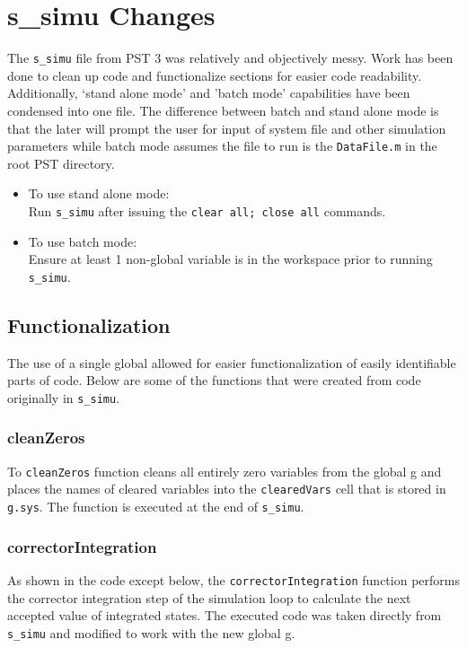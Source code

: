 \section{s\_simu Changes}
The \verb|s_simu| file from PST 3 was relatively and objectively messy.
Work has been done to clean up code and functionalize sections for easier code readability.
Additionally, `stand alone mode' and 'batch mode' capabilities have been condensed into one file.
The difference between batch and stand alone mode is that the later will prompt the user for input of system file and other simulation parameters while batch mode assumes the file to run is the \verb|DataFile.m| in the root PST directory.
\begin{itemize}
\item To use stand alone mode:\\
Run \verb|s_simu| after issuing the \verb|clear all; close all| commands.
\item To use batch mode:\\
Ensure at least 1 non-global variable is in the workspace prior to running \verb|s_simu|.
\end{itemize}


\subsection{Functionalization}
The use of a single global allowed for easier functionalization of easily identifiable parts of code.
Below are some of the functions that were created from code originally in \verb|s_simu|.



\subsubsection{cleanZeros}  
To \verb|cleanZeros| function cleans all entirely zero variables from the global g and places the names of cleared variables into the \verb|clearedVars| cell that is stored in \verb|g.sys|.
The function is executed at the end of \verb|s_simu|.


\subsubsection{correctorIntegration}  
As shown in the code except below, the \verb|correctorIntegration| function performs the corrector integration step of the simulation loop to calculate the next accepted value of integrated states.
The executed code was taken directly from \verb|s_simu| and modified to work with the new global g.

